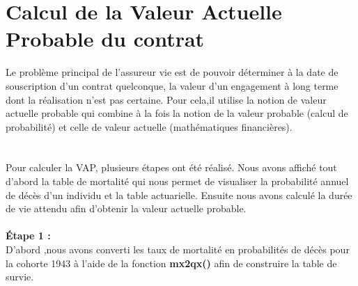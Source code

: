 \documentclass[french]{report}
\begin{document}
\section{Calcul de la Valeur Actuelle Probable  du contrat}
Le problème principal de l’assureur vie est de pouvoir déterminer à la date de souscription d’un contrat quelconque, la valeur d’un engagement à long terme dont la réalisation n’est pas certaine. Pour cela,il utilise la notion de valeur actuelle probable qui combine à la fois la notion de la valeur probable (calcul de probabilité) et celle de valeur actuelle (mathématiques financières).\\
\\
\\
Pour calculer la VAP, plusieurs étapes ont été réalisé.
Nous avons affiché tout d'abord la  table de mortalité qui nous permet de visualiser la probabilité annuel de décès d'un individu et la table actuarielle. Ensuite nous avons calculé la durée de vie attendu afin d'obtenir la valeur actuelle probable.
\\

\\ \textbf{ Étape 1 :} \\
\newline
D'abord ,nous avons converti les taux de mortalité en probabilités de décès
pour la cohorte 1943 à l'aide de la fonction \textbf{mx2qx()} afin de construire la table de survie.\\ 
\end{document}
